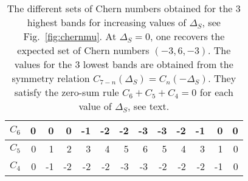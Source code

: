 \documentclass[aps,pra,showpacs,twocolumn,superscriptaddress]{revtex4-1}
\begin{document}
\begin{table}[t!p]
\begin{ruledtabular}
\begin{tabular}{c|r|r|r|r|r|r|r|r|r|r|r|r}
$C_6$ & 0 &  0 &  0 & -1 & -2 & -2 & -3 & -3 & -2 & -1 &  0 & 0 \\ 
\hline
$C_5$ & 0 &  1 &  2 &  3 & 4 &  5 &  6 &  5 &  4 &  3 &  1 & 0 \\
\hline
$C_4$ & 0 & -1 & -2 & -2 & -2 & -3 & -3 & -2 & -2 & -2 & -1 & 0 
\end{tabular}
\end{ruledtabular}
\caption{\label{tab:chernmu} The different sets of Chern numbers obtained for the 3 
highest bands for increasing values of $\Delta_S$, see Fig.~\ref{fig:chernmu}. At 
$\Delta_S=0$, one recovers the expected set of Chern numbers $(-3,6,-3)$. 
The values for the 3 lowest bands are obtained from the symmetry relation 
$C_{7-n}(\Delta_S) = C_n(-\Delta_S)$. They satisfy the zero-sum rule $C_6+C_5+C_4=0$ 
for each value of $\Delta_S$, see text.} 
\end{table}
\end{document}
